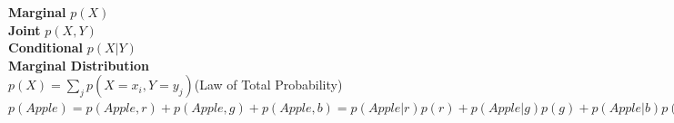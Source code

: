 \documentclass[12pt,a4paper]{extarticle}
\begin{document}
                                                                                                                                                                                                                                                                                                                                                                                                                                                                                                                                                                                                                                                                                                                                                                                                                                                                                                                                                                                                                                                                                                                                                                                                                                                                                                                                                                                                                                                                                                                                                                                                                                                                                                                                                                                                                                                                                                                                                                                                                                                                                                                                                
\textbf{Marginal} $p(X)$\\
\textbf{Joint} $p(X,Y)$\\
\textbf{Conditional} $p(X|Y)$\\
\newline
\textbf{Marginal Distribution}\\
$p(X) = \sum_jp(X=x_i,Y=y_j)$(Law of Total Probability)\\
$p(Apple)=p(Apple,r)+p(Apple,g)+p(Apple,b)=p(Apple|r)p(r)+p(Apple|g)p(g)+p(Apple|b)p(b)$\\
\end{document}
